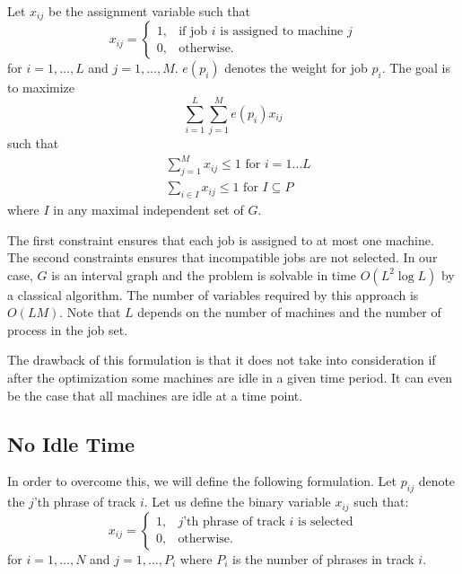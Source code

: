 \documentclass[11pt,a4paper]{article}
\begin{document}
Let $ x_{ij} $ be the assignment variable such that
\begin{equation}
x_{ij} =   \begin{cases}%
1,      & \text{if job $i$ is assigned to machine $j$}\\
0, & \text{otherwise.}
\end{cases}
\end{equation}
for $ i = 1, \dots ,L $ and $ j=1, \dots ,M  $. $ e(p_i) $ denotes the weight for job $ p_i $. The goal is to maximize 
\begin{equation}
\sum_{i=1}^L \sum_{j=1}^M e(p_{i})x_{ij}	
\end{equation}
such that
\begin{align}
&\sum_{j=1}^M x_{ij} \leq 1 \mbox{ for }i=1\dots L \\
&\sum_{i \in I} x_{ij} \leq 1 \mbox{ for } I \subseteq P
\end{align}
where $ I $ in any maximal independent set of $ G $.


The first constraint ensures that each job is assigned to at most one machine. The second constraints ensures that incompatible jobs are not selected. In our case, $ G $ is an interval graph and the problem is solvable in time $ O(L^2 \log L) $ by a classical algorithm. The number of variables required by this approach is $ O(LM) $. Note that $ L $ depends on the number of machines and the number of process in the job set.

The drawback of this formulation is that it does not take into consideration if after the optimization some machines are idle in a given time period. It can even be the case that all machines are idle at a time point.  


\subsection{No Idle Time}

In order to overcome this, we will define the following formulation. Let $ p_{ij} $ denote the $ j $'th phrase of track $ i $. Let us define the binary variable $x_{ij}$ such that:
\begin{equation}
x_{ij} =   \begin{cases}%
1,      & \text{$j$'th phrase of track $i$ is selected}\\
0, & \text{otherwise.}
\end{cases}
\end{equation}
for $ i = 1, \dots ,N $ and $ j=1, \dots ,P_i  $ where $P_i$ is the number of phrases in track $i$.
\end{document}
